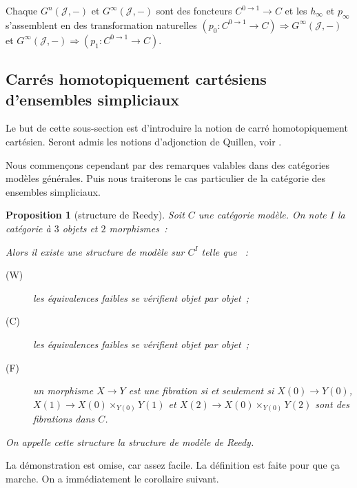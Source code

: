 \documentclass{amsart}
\theoremstyle{plain}
\newtheorem{prop}[theo]{Proposition}
\theoremstyle{definition}
\theoremstyle{remark}
\newcommand{\ra}{\rightarrow}
\begin{document}
Chaque $G^n(\mathcal{J},-)$ et $G^\infty(\mathcal{J},-)$ sont des foncteurs $C^{0\ra 1}\ra C$ et les $h_\infty$ et $p_\infty$
s'assemblent en des transformation naturelles $(p_0:C^{0\ra 1}\ra C)\Rightarrow G^\infty(\mathcal{J},-)$ et
$G^\infty(\mathcal{J},-)\Rightarrow (p_1:C^{0\ra 1}\ra C)$.


\subsection{Carrés homotopiquement cartésiens d'ensembles simpliciaux}
\label{carrehomotopiquementcart}

Le but de cette sous-section est d'introduire la notion de carré homotopiquement cartésien.
Seront admis les notions d'adjonction de Quillen, voir \cite[1.6]{Idri}.

Nous commençons cependant par des remarques valables dans des catégories modèles générales.
Puis nous traiterons le cas particulier de la catégorie des ensembles simpliciaux.

\begin{prop}[structure de Reedy]
  Soit $C$ une catégorie modèle. On note $I$ la catégorie à $3$ objets et $2$ morphismes~:
  \begin{center}
  \end{center}
  Alors il existe une structure de modèle sur $C^I$ telle que ~:
  \begin{description}
    \item[(W)] les équivalences faibles se vérifient objet par objet~;
    \item[(C)] les équivalences faibles se vérifient objet par objet~;
    \item[(F)] un morphisme $X\ra Y$ est une fibration si et seulement si $X(0)\ra Y(0)$, $X(1)\ra X(0)\times_{Y(0)} Y(1)$
    et $X(2)\ra X(0)\times_{Y(0)} Y(2)$ sont des fibrations dans $C$.
  \end{description}
  On appelle cette structure la structure de modèle de Reedy.
\end{prop}

La démonstration est omise, car assez facile. La définition est faite pour que ça marche. On a immédiatement le corollaire suivant.
\end{document}

